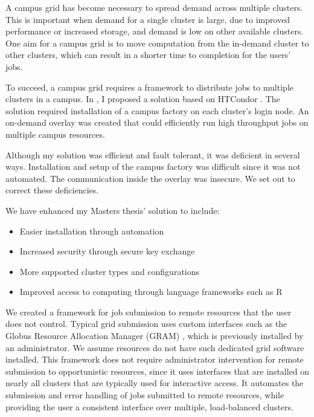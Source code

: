 A campus grid has become necessary to spread demand across multiple clusters.  This is important when demand for a single cluster is large, due to improved performance or increased storage, and demand is low on other available clusters.  One aim for a campus grid is to move computation from the in-demand cluster to other clusters, which can result in a shorter time to completion for the users' jobs.

To succeed, a campus grid requires a framework to distribute jobs to multiple clusters in a campus.  In \cite{weitzel2011campus}, I proposed a solution based on HTCondor \cite{litzkow1988condor}.  The solution required installation of a campus factory \cite{website:campusfactory} on each cluster's login node.  An on-demand overlay was created that could efficiently run high throughput jobs on multiple campus resources.  

Although my solution was efficient and fault tolerant, it was deficient in several ways.  Installation and setup of the campus factory was difficult since it was not automated.  The communication inside the overlay was insecure.  We set out to correct these deficiencies.


We have enhanced my Masters thesis' solution to include:
\begin{itemize}
\item Easier installation through automation
\item Increased security through secure key exchange
\item More supported cluster types and configurations
\item Improved access to computing through language frameworks such as R \cite{team2005r}
\end{itemize}

We created a framework for job submission to remote resources that the user does not control.  Typical grid submission uses custom interfaces such as the Globus Resource Allocation Manager (GRAM) \cite{foster1999globus}, which is previously installed by an administrator.  We assume resources do not have such dedicated grid software installed.  This framework does not require administrator intervention for remote submission to opportunistic resources, since it uses interfaces that are installed on nearly all clusters that are typically used for interactive access.  It automates the submission and error handling of jobs submitted to remote resources, while providing the user a consistent interface over multiple, load-balanced clusters.

